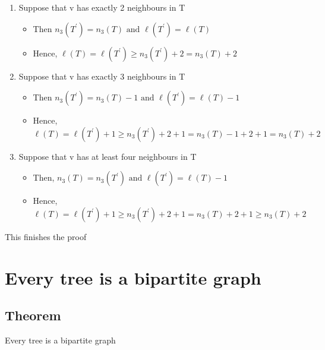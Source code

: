 \documentclass{article}[18pt]
\begin{document}
\begin{enumerate}
	\item Suppose that v has exactly 2 neighbours in T
	\begin{itemize}
		\item Then $n _ { 3 } \left( T ^ { \prime } \right) = n _ { 3 } ( T ) \text { and } \ell \left( T ^ { \prime } \right) = \ell ( T )$
		\item Hence, $\ell ( T ) = \ell \left( T ^ { \prime } \right) \geq n _ { 3 } \left( T ^ { \prime } \right) + 2 = n _ { 3 } ( T ) + 2$
	\end{itemize}
	\item Suppose that v has exactly 3 neighbours in T
	\begin{itemize}
		\item Then $n _ { 3 } \left( T ^ { \prime } \right) = n _ { 3 } ( T ) - 1 \text { and } \ell \left( T ^ { \prime } \right) = \ell ( T ) - 1$
		\item Hence, $\ell ( T ) = \ell \left( T ^ { \prime } \right) + 1 \geq n _ { 3 } \left( T ^ { \prime } \right) + 2 + 1 = n _ { 3 } ( T ) - 1 + 2 + 1 = n _ { 3 } ( T ) + 2$
	\end{itemize}
	\item Suppose that v has at least four neighbours in T
	\begin{itemize}
		\item Then, $n _ { 3 } ( T ) = n _ { 3 } \left( T ^ { \prime } \right) \text { and } \ell \left( T ^ { \prime } \right) = \ell ( T ) - 1$
		\item Hence, $\ell ( T ) = \ell \left( T ^ { \prime } \right) + 1 \geq n _ { 3 } \left( T ^ { \prime } \right) + 2 + 1 = n _ { 3 } ( T ) + 2 + 1 \geq n _ { 3 } ( T ) + 2$
	\end{itemize}
\end{enumerate}
This finishes the proof
\section{Every tree is a bipartite graph}
\subsection{Theorem}
Every tree is a bipartite graph
\end{document}
